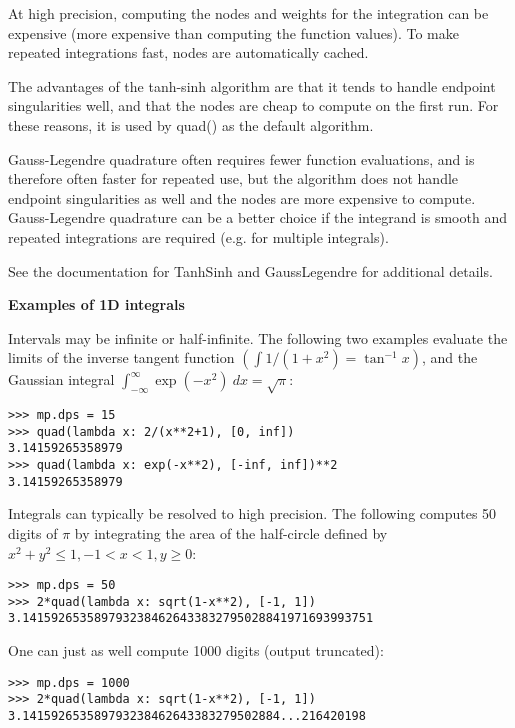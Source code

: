 \vpara
At high precision, computing the nodes and weights for the integration can be expensive (more expensive than computing the function values). To make repeated integrations fast, nodes are automatically cached.

\vpara
The advantages of the tanh-sinh algorithm are that it tends to handle endpoint singularities well, and that the nodes are cheap to compute on the first run. For these reasons, it is used by quad() as the default algorithm.

\vpara
Gauss-Legendre quadrature often requires fewer function evaluations, and is therefore often faster for repeated use, but the algorithm does not handle endpoint singularities as well and the nodes are more expensive to compute. Gauss-Legendre quadrature can be a better choice if the integrand is smooth and repeated integrations are required
(e.g. for multiple integrals).

\vpara
See the documentation for TanhSinh and GaussLegendre for additional details. 

\vpara
\textbf{Examples of 1D integrals}

Intervals may be infinite or half-infinite. The following two examples evaluate the limits of the inverse tangent function $(\int 1/(1+x^2)=\tan^{-1} x)$, and the Gaussian integral $\int_{-\infty}^{\infty}\exp(-x^2)\: dx=\sqrt{\pi}$:

\begin{lstlisting}
>>> mp.dps = 15
>>> quad(lambda x: 2/(x**2+1), [0, inf])
3.14159265358979
>>> quad(lambda x: exp(-x**2), [-inf, inf])**2
3.14159265358979
\end{lstlisting}


Integrals can typically be resolved to high precision. The following computes 50 digits of $\pi$ by integrating the area of the half-circle defined by $x^2+y^2 \leq 1, -1<x<1, y \geq 0$:

\begin{lstlisting}
>>> mp.dps = 50
>>> 2*quad(lambda x: sqrt(1-x**2), [-1, 1])
3.1415926535897932384626433832795028841971693993751
\end{lstlisting}

One can just as well compute 1000 digits (output truncated):

\begin{lstlisting}
>>> mp.dps = 1000
>>> 2*quad(lambda x: sqrt(1-x**2), [-1, 1])
3.141592653589793238462643383279502884...216420198
\end{lstlisting}

